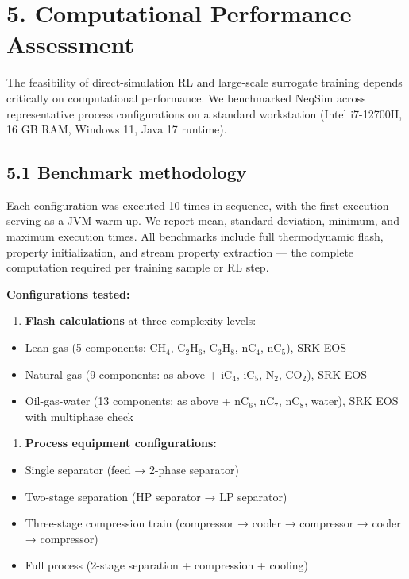 \documentclass[review,3p]{custom}
\begin{document}
\section{5. Computational Performance Assessment}

The feasibility of direct-simulation RL and large-scale surrogate training depends critically on computational performance. We benchmarked NeqSim across representative process configurations on a standard workstation (Intel i7-12700H, 16 GB RAM, Windows 11, Java 17 runtime).

\subsection{5.1 Benchmark methodology}

Each configuration was executed 10 times in sequence, with the first execution serving as a JVM warm-up. We report mean, standard deviation, minimum, and maximum execution times. All benchmarks include full thermodynamic flash, property initialization, and stream property extraction --- the complete computation required per training sample or RL step.

\textbf{Configurations tested:}

\begin{enumerate}
  \item \textbf{Flash calculations} at three complexity levels:
\end{enumerate}
\begin{itemize}
  \item Lean gas (5 components: CH$_4$, C$_2$H$_6$, C$_3$H$_8$, nC$_4$, nC$_5$), SRK EOS
  \item Natural gas (9 components: as above + iC$_4$, iC$_5$, N$_2$, CO$_2$), SRK EOS
  \item Oil-gas-water (13 components: as above + nC$_6$, nC$_7$, nC$_8$, water), SRK EOS with multiphase check
\end{itemize}

\begin{enumerate}
  \item \textbf{Process equipment configurations:}
\end{enumerate}
\begin{itemize}
  \item Single separator (feed → 2-phase separator)
  \item Two-stage separation (HP separator → LP separator)
  \item Three-stage compression train (compressor → cooler → compressor → cooler → compressor)
  \item Full process (2-stage separation + compression + cooling)
\end{itemize}
\end{document}
